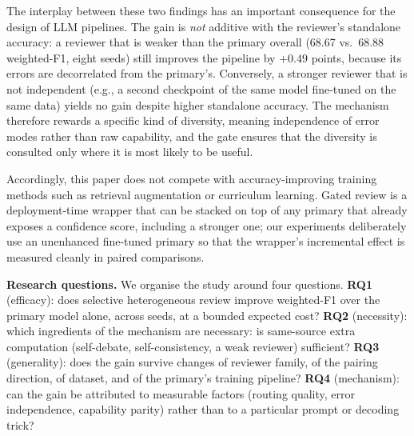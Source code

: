 \documentclass[final,5p,times,twocolumn]{elsarticle}
\begin{document}
The interplay between these two findings has an important consequence for
the design of LLM pipelines. The gain is \emph{not} additive with the
reviewer's standalone accuracy: a reviewer that is weaker than the primary
overall (68.67 vs.\ 68.88 weighted-F1, eight seeds) still improves the pipeline by $+0.49$
points, because its errors are decorrelated from the primary's. Conversely,
a stronger reviewer that is not independent (e.g., a second checkpoint of
the same model fine-tuned on the same data) yields no gain despite higher
standalone accuracy. The mechanism therefore rewards a specific kind of
diversity, meaning independence of error modes rather than raw capability, and the
gate ensures that the diversity is consulted only where it is most likely
to be useful.

Accordingly, this paper does not compete with accuracy-improving training
methods such as retrieval augmentation or curriculum learning. Gated review
is a deployment-time wrapper that can be stacked on top of any primary that
already exposes a confidence score, including a stronger one; our experiments
deliberately use an unenhanced fine-tuned primary so that the wrapper's
incremental effect is measured cleanly in paired comparisons.

\noindent\textbf{Research questions.}
We organise the study around four questions. \textbf{RQ1} (efficacy): does
selective heterogeneous review improve weighted-F1 over the primary model
alone, across seeds, at a bounded expected cost? \textbf{RQ2} (necessity):
which ingredients of the mechanism are necessary: is same-source extra
computation (self-debate, self-consistency, a weak reviewer) sufficient?
\textbf{RQ3} (generality): does the gain survive changes of reviewer
family, of the pairing direction, of dataset, and of the primary's training
pipeline? \textbf{RQ4} (mechanism): can the gain be attributed to
measurable factors (routing quality, error independence, capability
parity) rather than to a particular prompt or decoding trick?
\end{document}
